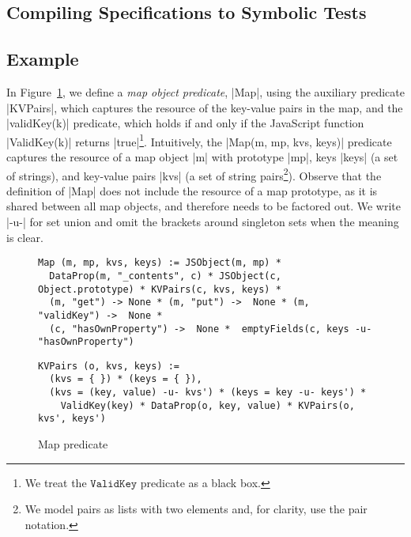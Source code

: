 \subsection{Compiling Specifications to Symbolic Tests}



\subsection{Example} 

In Figure~\ref{fig:map:example}, we define a \emph{map object predicate}, \jsinline|Map|, 
using the auxiliary predicate \jsinline|KVPairs|, which captures the resource of the key-value pairs in the map, 
and the \jsinline|validKey(k)| predicate, which holds if and only if the 
JavaScript function \jsinline|ValidKey(k)| returns \jsinline|true|\footnote{We treat the $\mathtt{ValidKey}$ predicate as a black box.}.
%
Intuitively, the \jsinline|Map(m, mp, kvs, keys)| predicate captures the resource 
of a map object \jsinline|m| with prototype \jsinline|mp|, keys \jsinline|keys| (a set of strings),
and key-value pairs \jsinline|kvs| (a set of string pairs\footnote{We model pairs as lists with two elements and, for clarity, use the pair notation.}). 
Observe that the definition of \jsinline|Map| does not include the resource of a map prototype, as
it is shared between all map objects, and therefore needs to be factored out.  
%
We write \jsinline|-u-| for set union and omit the brackets around singleton 
sets when the meaning is clear. %

\begin{figure}[t!]
{\scriptsize
 \begin{verbatim}
Map (m, mp, kvs, keys) := JSObject(m, mp) * 
  DataProp(m, "_contents", c) * JSObject(c, Object.prototype) * KVPairs(c, kvs, keys) *
  (m, "get") -> None * (m, "put") ->  None * (m, "validKey") ->  None * 
  (c, "hasOwnProperty") ->  None *  emptyFields(c, keys -u- "hasOwnProperty")
  \end{verbatim}
  \vspace*{-0.3cm}
 \begin{verbatim}
KVPairs (o, kvs, keys) := 
  (kvs = { }) * (keys = { }),
  (kvs = (key, value) -u- kvs') * (keys = key -u- keys') * 
    ValidKey(key) * DataProp(o, key, value) * KVPairs(o, kvs', keys')
\end{verbatim}}
\caption{Map predicate \label{fig:map:example}}
\end{figure}

